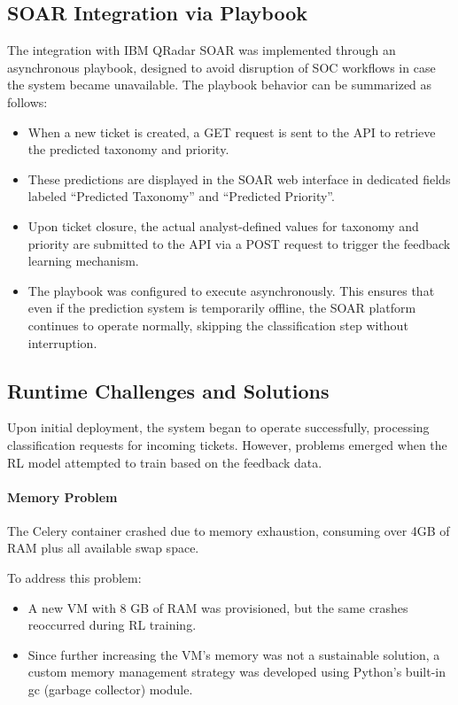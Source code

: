\subsection{SOAR Integration via Playbook}

The integration with IBM QRadar SOAR was implemented through an asynchronous playbook, designed to avoid disruption of SOC workflows in case the system became unavailable. The playbook behavior can be summarized as follows:

\begin{itemize}
    \item When a new ticket is created, a GET request is sent to the API to retrieve the predicted taxonomy and priority.
    \item These predictions are displayed in the SOAR web interface in dedicated fields labeled ``Predicted Taxonomy'' and ``Predicted Priority''.
    \item Upon ticket closure, the actual analyst-defined values for taxonomy and priority are submitted to the API via a POST request to trigger the feedback learning mechanism.
    \item The playbook was configured to execute asynchronously. This ensures that even if the prediction system is temporarily offline, the SOAR platform continues to operate normally, skipping the classification step without interruption.
\end{itemize}

\subsection{Runtime Challenges and Solutions}
Upon initial deployment, the system began to operate successfully, processing classification requests for incoming tickets.
However, problems emerged when the RL model attempted to train based on the feedback data. 

\paragraph{Memory Problem}
The Celery container crashed due to memory exhaustion, consuming over 4GB of RAM plus all available swap space.

To address this problem:
\begin{itemize}
    \item A new VM with 8 GB of RAM was provisioned, but the same crashes reoccurred during RL training.
    \item Since further increasing the VM's memory was not a sustainable solution, a custom memory management strategy was developed using Python's built-in gc (garbage collector) module.
\end{itemize} 

